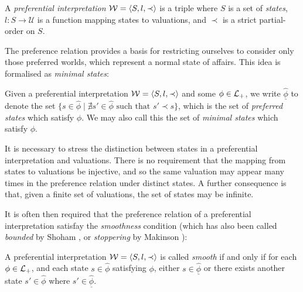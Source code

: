 \begin{definition}
	\label{definition:preferential-interpretation} 

	A \emph{preferential interpretation} $\mathcal{W} = \langle S,l,\prec \rangle$ is a triple where $S$ is a set of \emph{states}, $l: S \to \mathcal{U}$ is
	a function mapping states to valuations, and $\prec$ is a strict partial-order on $S$.
\end{definition}

The preference relation provides a basis for restricting ourselves to consider only those preferred worlds, which
represent a normal state of affairs. This idea is formalised as \textit{minimal states}:

\begin{definition}
	\label{definition:state-minimal}

	Given a preferential interpretation $\mathcal{W} = \langle S,l,\prec \rangle$ and some $\phi \in \mathcal{L}_+$, we write $\underline{\hat{\phi}}$ to denote the set
	$\{s \in \hat{\phi}\mid \nexists s' \in \hat{\phi}\text{ such that }s' \prec s \}$, which is the set of \textit{preferred
	states} which satisfy $\phi$. We may also call this the set of \textit{minimal states} which satisfy $\phi$.
\end{definition}

It is necessary to stress the distinction between states in a preferential interpretation and valuations. There is no
requirement that the mapping from states to valuations be injective, and so the same valuation may appear many times in the
preference relation under distinct states. A further consequence is that, given a finite set of valuations, the set of
states may be infinite.

It is often then required that the preference relation of a preferential interpretation satisfay the \textit{smoothness}
condition (which has also been called \textit{bounded} by Shoham \cite{shohamSemanticApproach}, or \textit{stoppering} by
Makinson \cite{makinson2003bridges}):

\begin{definition}
	\label{definition:smoothness} 

	A preferential interpretation $\mathcal{W} = \langle S,l,\prec \rangle$ is called \textit{smooth} if and only if for each $\phi \in \mathcal{L}_+$, and each
	state $s \in \hat{\phi}$ satisfying $\phi$, either $s \in \underline{\hat{\phi}}$ or there exists another state $s' \in
	\hat{\phi}$ where $s' \in \underline{\hat{\phi}}$.
\end{definition}

